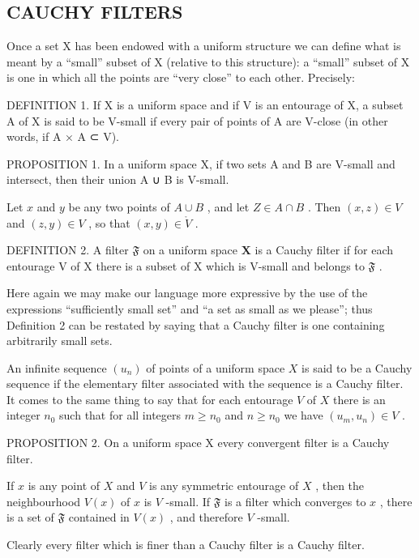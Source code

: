 \subsection{CAUCHY FILTERS}

Once a set X has been endowed with a uniform structure we can define what is meant by a ``small'' subset of X (relative to this structure): a ``small'' subset of X is one in which all the points are ``very close'' to each other. Precisely:

DEFINITION 1. If X is a uniform space and if V is an entourage of X, a subset A of X is said to be V-small if every pair of points of A are V-close (in other words, if A × A ⊂ V).

PROPOSITION 1. In a uniform space X, if two sets A and B are V-small and intersect, then their union A ∪ B is V-small.

Let \(x\) and \(y\) be any two points of \(A \cup B\) , and let \(Z \in A \cap B\) . Then \((x, z) \in V\) and \((z, y) \in V\) , so that \((x, y) \in \mathring{V}\) .

DEFINITION 2. A filter \(\mathfrak{F}\) on a uniform space \(\mathbf{X}\) is a Cauchy filter if for each entourage V of X there is a subset of X which is V-small and belongs to \(\mathfrak{F}\) .

Here again we may make our language more expressive by the use of the expressions ``sufficiently small set'' and ``a set as small as we please''; thus Definition 2 can be restated by saying that a Cauchy filter is one containing arbitrarily small sets.

An infinite sequence \((u_n)\) of points of a uniform space \(X\) is said to be a Cauchy sequence if the elementary filter associated with the sequence is a Cauchy filter. It comes to the same thing to say that for each entourage \(V\) of \(X\) there is an integer \(n_0\) such that for all integers \(m \geqslant n_0\) and \(n \geqslant n_0\) we have \((u_m, u_n) \in V\) .

PROPOSITION 2. On a uniform space X every convergent filter is a Cauchy filter.

If \(x\) is any point of \(X\) and \(V\) is any symmetric entourage of \(X\) , then the neighbourhood \(V(x)\) of \(x\) is \(V\) -small. If \(\mathfrak{F}\) is a filter which converges to \(x\) , there is a set of \(\mathfrak{F}\) contained in \(V(x)\) , and therefore \(V\) -small.

Clearly every filter which is finer than a Cauchy filter is a Cauchy filter.

